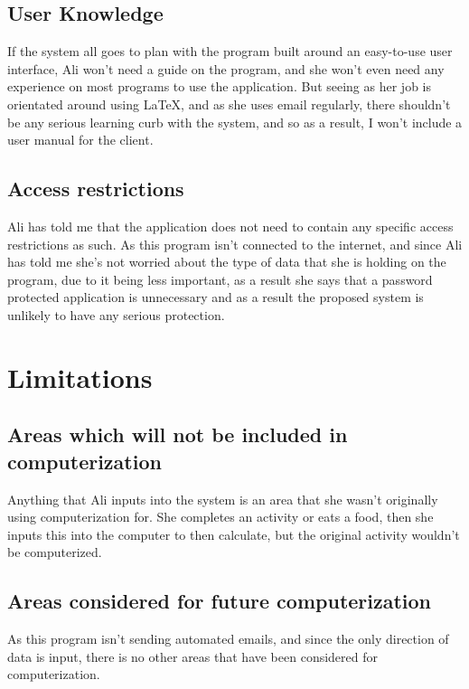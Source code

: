 \subsection{User Knowledge}
If the system all goes to plan with the program built around an easy-to-use user interface, Ali won't need a guide on the program, and she won't even need any experience on most programs to use the application. But seeing as her job is orientated around using LaTeX, and as she uses email regularly, there shouldn't be any serious learning curb with the system, and so as a result, I won't include a user manual for the client.

\subsection{Access restrictions}
Ali has told me that the application does not need to contain any specific access restrictions as such. As this program isn't connected to the internet, and since Ali has told me she's not worried about the type of data that she is holding on the program, due to it being less important, as a result she says that a password protected application is unnecessary and as a result the proposed system is unlikely to have any serious protection.


\section{Limitations}

\subsection{Areas which will not be included in computerization}
Anything that Ali inputs into the system is an area that she wasn't originally using computerization for. She completes an activity or eats a food, then she inputs this into the computer to then calculate, but the original activity wouldn't be computerized.

\subsection{Areas considered for future computerization}
As this program isn't sending automated emails, and since the only direction of data is input, there is no other areas that have been considered for computerization.



